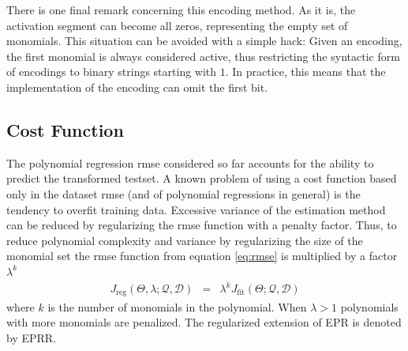 \documentclass[preprint,authoryear,12pt]{elsarticle}
\begin{document}
There is one final remark concerning this encoding method. As it is, the activation segment can become all zeros, representing the empty set of monomials. This situation can be avoided with a simple hack: Given an encoding, the first monomial is always considered active, thus restricting the syntactic form of encodings to binary strings starting with $1$. In practice, this means that the implementation of the encoding can omit the first bit.

\subsection{Cost Function}\label{subs:cost.function}

The polynomial regression \ac{rmse} considered so far accounts for the ability to predict the transformed testset. A known problem of using a cost function based only in the dataset \ac{rmse} (and of polynomial regressions in general) is the tendency to overfit  training data. Excessive variance of the estimation method can be reduced by regularizing the \ac{rmse} function with a penalty factor. Thus, to reduce polynomial complexity and variance by regularizing the size of the monomial set the \ac{rmse} function from equation \ref{eq:rmse} is multiplied by a factor $\lambda^{k}$
\begin{eqnarray}
J_{\textrm{reg}}\left(\Theta, \lambda;\mathcal{Q},\mathcal{D}\right) &=& \lambda^{k} J_{\textrm{fit}}\left(\Theta;\mathcal{Q},\mathcal{D}\right)\label{eq:rmse-reg}
\end{eqnarray}
%
where $k$ is the number of monomials in the polynomial. When $\lambda > 1$ polynomials with more monomials are penalized. The regularized extension of \ac{EPR} is denoted by \acf{EPRR}. 
\end{document}
